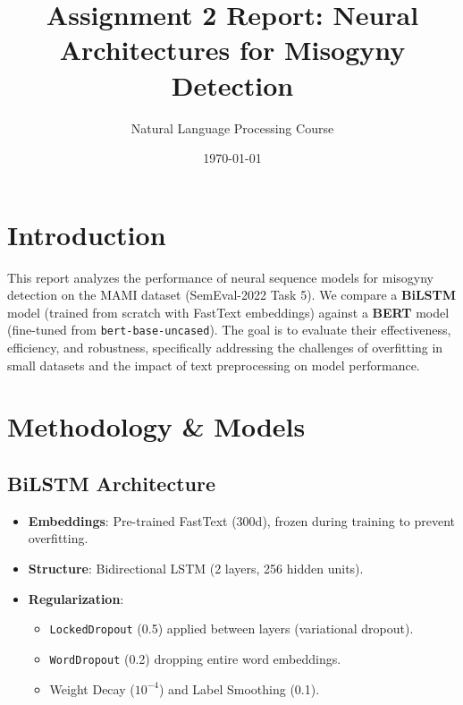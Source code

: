 \documentclass{article}
\title{Assignment 2 Report: Neural Architectures for Misogyny Detection}
\author{Natural Language Processing Course}
\date{\today}
\begin{document}
\maketitle

\section{Introduction}
This report analyzes the performance of neural sequence models for misogyny detection on the MAMI dataset (SemEval-2022 Task 5). We compare a \textbf{BiLSTM} model (trained from scratch with FastText embeddings) against a \textbf{BERT} model (fine-tuned from \texttt{bert-base-uncased}). The goal is to evaluate their effectiveness, efficiency, and robustness, specifically addressing the challenges of overfitting in small datasets and the impact of text preprocessing on model performance.

\section{Methodology \& Models}

\subsection{BiLSTM Architecture}
\begin{itemize}
    \item \textbf{Embeddings}: Pre-trained FastText (300d), frozen during training to prevent overfitting.
    \item \textbf{Structure}: Bidirectional LSTM (2 layers, 256 hidden units).
    \item \textbf{Regularization}: 
    \begin{itemize}
        \item \texttt{LockedDropout} (0.5) applied between layers (variational dropout).
        \item \texttt{WordDropout} (0.2) dropping entire word embeddings.
        \item Weight Decay ($10^{-4}$) and Label Smoothing (0.1).
    \end{itemize}
\end{itemize}
\end{document}
